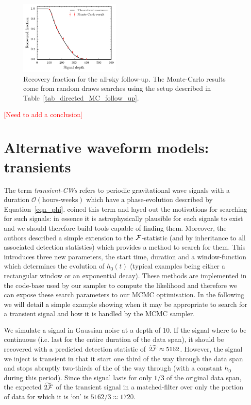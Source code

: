 \documentclass[aps, prd, twocolumn, superscriptaddress, floatfix, showpacs, nofootinbib, longbibliography]{revtex4-1}
\newcommand{\comment}[1]{\textcolor{red}{[#1]}}
\begin{document}
\begin{figure}[htb]
\centering
\includegraphics[width=0.45\textwidth]{allsky_recovery}
\caption{Recovery fraction for the all-sky follow-up. The Monte-Carlo results
come from random draws searches using the setup described in
Table~\ref{tab_directed_MC_follow_up}.}
\label{fig_allsky_MC_follow_up}
\end{figure}

\comment{Need to add a conclusion}

\section{Alternative waveform models: transients}
\label{sec_transients}

The term \emph{transient-CWs} refers to periodic gravitational wave signals
with a duration $\mathcal{O}(\textrm{hours-weeks})$ which have a
phase-evolution described by Equation~\eqref{eqn_phi}. \citet{prix2011} coined
this term and layed out the motivations for searching for such signals: in
essence it is astrophysically plausible for each signals to exist and we should
therefore build tools capable of finding them. Moreover, the authors described
a simple extension to the ${\mathcal{F}}$-statistic (and by inheritance to all associated
detection statistics) which provides a method to search for them. This
introduces three new parameters, the start time, duration and a window-function
which determines the evolution of $h_0(t)$ (typical examples being either a
rectangular window or an exponential decay). These methods are implemented in
the code-base used by our sampler to compute the likelihood and therefore we
can expose these search parameters to our MCMC optimisation. In the following
we will detail a simple example showing when it may be appropriate to search for
a transient signal and how it is handled by the MCMC sampler.

We simulate a signal in Gaussian noise at a depth of 10. If the signal where to
be continuous (i.e. last for the entire duration of the data span), it should
be recovered with a predicted detection statistic of
$\widetilde{2{\mathcal{F}}}\approx5162$. However, the signal we inject is transient in
that it start one third of the way through the data span and stops abruptly
two-thirds of the of the way through (with a constant $h_0$ during this
period). Since the signal lasts for only $1/3$ of the original data span, the
expected $\widetilde{2{\mathcal{F}}}$ of the transient signal in a matched-filter over only
the portion of data for which it is `on' is $5162/3\approx1720$.
\end{document}
